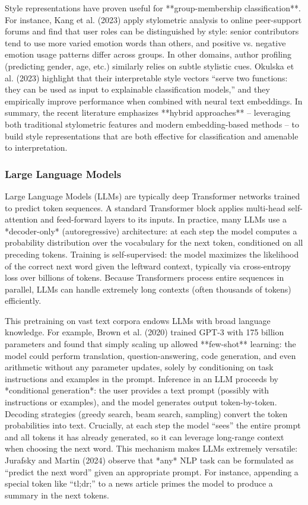 Style representations have proven useful for **group-membership classification**.  For instance, Kang et al. (2023) apply stylometric analysis to online peer-support forums and find that user roles can be distinguished by style: senior contributors tend to use more varied emotion words than others, and positive vs. negative emotion usage patterns differ across groups.  In other domains, author profiling (predicting gender, age, etc.) similarly relies on subtle stylistic cues.  Okulska et al. (2023) highlight that their interpretable style vectors “serve two functions: they can be used as input to explainable classification models,” and they empirically improve performance when combined with neural text embeddings.  In summary, the recent literature emphasizes **hybrid approaches** – leveraging both traditional stylometric features and modern embedding-based methods – to build style representations that are both effective for classification and amenable to interpretation.

\subsubsection{Large Language Models}

Large Language Models (LLMs) are typically deep Transformer networks trained to predict token sequences. A standard Transformer block applies multi-head self-attention and feed-forward layers to its inputs.  In practice, many LLMs use a *decoder-only* (autoregressive) architecture: at each step the model computes a probability distribution over the vocabulary for the next token, conditioned on all preceding tokens.  Training is self-supervised: the model maximizes the likelihood of the correct next word given the leftward context, typically via cross-entropy loss over billions of tokens.  Because Transformers process entire sequences in parallel, LLMs can handle extremely long contexts (often thousands of tokens) efficiently.

This pretraining on vast text corpora endows LLMs with broad language knowledge.  For example, Brown et al. (2020) trained GPT-3 with 175 billion parameters and found that simply scaling up allowed **few-shot** learning: the model could perform translation, question-answering, code generation, and even arithmetic without any parameter updates, solely by conditioning on task instructions and examples in the prompt.  Inference in an LLM proceeds by *conditional generation*: the user provides a text prompt (possibly with instructions or examples), and the model generates output token-by-token. Decoding strategies (greedy search, beam search, sampling) convert the token probabilities into text.  Crucially, at each step the model “sees” the entire prompt and all tokens it has already generated, so it can leverage long-range context when choosing the next word.  This mechanism makes LLMs extremely versatile: Jurafsky and Martin (2024) observe that *any* NLP task can be formulated as “predict the next word” given an appropriate prompt. For instance, appending a special token like “tl;dr;” to a news article primes the model to produce a summary in the next tokens.

